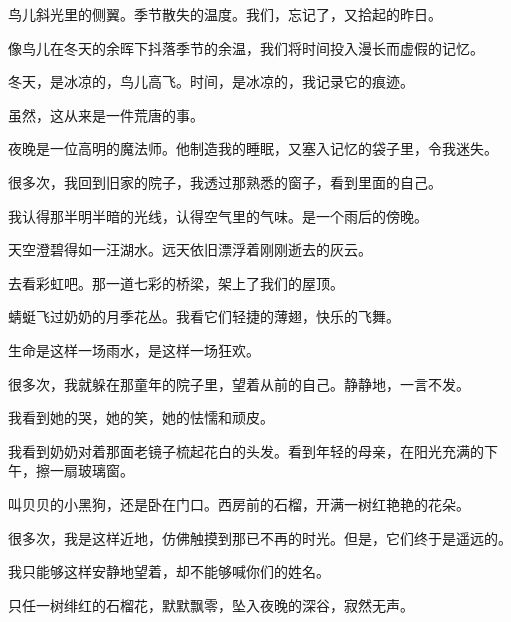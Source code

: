 \documentclass[12pt,a4paper]{article}
\begin{document}
		鸟儿斜光里的侧翼。季节散失的温度。我们，忘记了，又拾起的昨日。


		像鸟儿在冬天的余晖下抖落季节的余温，我们将时间投入漫长而虚假的记忆。\par
		冬天，是冰凉的，鸟儿高飞。时间，是冰凉的，我记录它的痕迹。\par
		虽然，这从来是一件荒唐的事。

		夜晚是一位高明的魔法师。他制造我的睡眠，又塞入记忆的袋子里，令我迷失。\par
		很多次，我回到旧家的院子，我透过那熟悉的窗子，看到里面的自己。\par
		我认得那半明半暗的光线，认得空气里的气味。是一个雨后的傍晚。\par
		天空澄碧得如一汪湖水。远天依旧漂浮着刚刚逝去的灰云。\par
		去看彩虹吧。那一道七彩的桥梁，架上了我们的屋顶。\par
		蜻蜓飞过奶奶的月季花丛。我看它们轻捷的薄翅，快乐的飞舞。\par
		生命是这样一场雨水，是这样一场狂欢。\par
		很多次，我就躲在那童年的院子里，望着从前的自己。静静地，一言不发。\par
		我看到她的哭，她的笑，她的怯懦和顽皮。\par
		我看到奶奶对着那面老镜子梳起花白的头发。看到年轻的母亲，在阳光充满的下午，擦一扇玻璃窗。\par
		叫贝贝的小黑狗，还是卧在门口。西房前的石榴，开满一树红艳艳的花朵。\par
		很多次，我是这样近地，仿佛触摸到那已不再的时光。但是，它们终于是遥远的。\par
		我只能够这样安静地望着，却不能够喊你们的姓名。\par
		只任一树绯红的石榴花，默默飘零，坠入夜晚的深谷，寂然无声。
\end{document}
